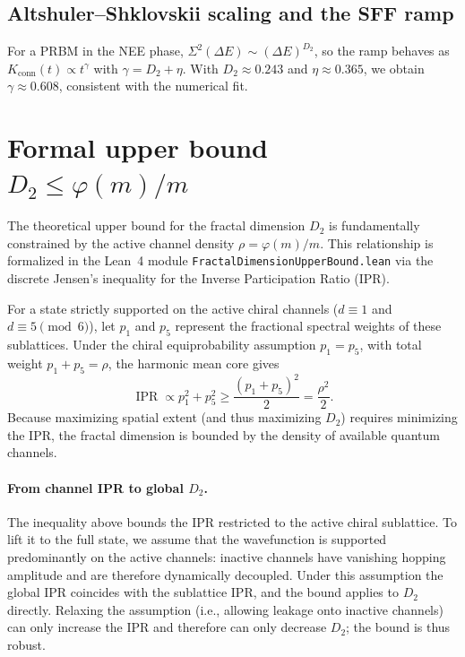 \documentclass[11pt,a4paper]{article}
\DeclareMathOperator{\IPR}{IPR}
\begin{document}
\subsection{Altshuler--Shklovskii scaling and the SFF ramp}
For a PRBM in the NEE phase, $\Sigma^2(\Delta E) \sim (\Delta E)^{D_2}$, so the ramp behaves as $K_{\text{conn}}(t) \propto t^{\gamma}$ with $\gamma = D_2 + \eta$. With $D_2 \approx 0.243$ and $\eta \approx 0.365$, we obtain $\gamma \approx 0.608$, consistent with the numerical fit.

\section{Formal upper bound \texorpdfstring{$D_2 \le \varphi(m)/m$}{D2 <= phi(m)/m}}
\label{app:bound}

The theoretical upper bound for the fractal dimension $D_2$ is fundamentally constrained by the active channel density $\rho = \varphi(m)/m$. This relationship is formalized in the Lean~4 module \texttt{FractalDimensionUpperBound.lean} via the discrete Jensen's inequality for the Inverse Participation Ratio (IPR).

For a state strictly supported on the active chiral channels ($d \equiv 1$ and $d \equiv 5 \pmod 6$), let $p_1$ and $p_5$ represent the fractional spectral weights of these sublattices. Under the chiral equiprobability assumption $p_1 = p_5$, with total weight $p_1 + p_5 = \rho$, the harmonic mean core gives
\begin{equation}
\IPR \propto p_1^2 + p_5^2 \ge \frac{(p_1 + p_5)^2}{2} = \frac{\rho^2}{2}.
\end{equation}
Because maximizing spatial extent (and thus maximizing $D_2$) requires minimizing the IPR, the fractal dimension is bounded by the density of available quantum channels.

\paragraph{From channel IPR to global $D_2$.}
The inequality above bounds the IPR restricted to the active chiral
sublattice. To lift it to the full state, we assume that the wavefunction
is supported predominantly on the active channels: inactive channels have
vanishing hopping amplitude and are therefore dynamically decoupled.
Under this assumption the global IPR coincides with the sublattice IPR,
and the bound applies to $D_2$ directly. Relaxing the assumption (i.e.,
allowing leakage onto inactive channels) can only increase the IPR and
therefore can only decrease $D_2$; the bound is thus robust.
\end{document}

